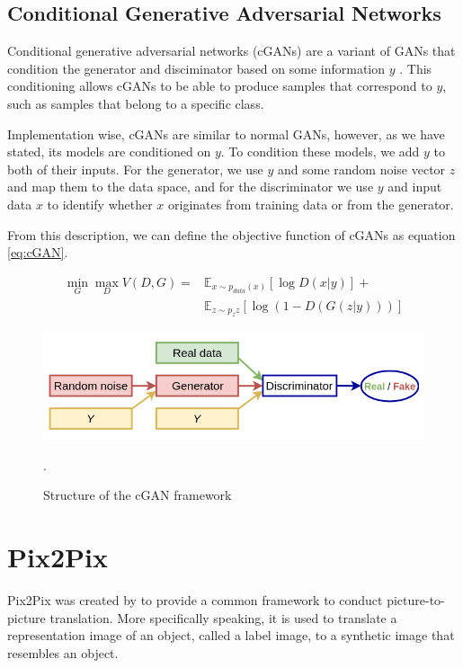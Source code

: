 \documentclass[peerreview]{IEEEtran}
\begin{document}
\subsection{Conditional Generative Adversarial Networks}
Conditional generative adversarial networks (cGANs) are a variant of GANs that condition the generator and disciminator based on some information $y$ \cite{mirza2014conditional}. This conditioning allows cGANs to be able to produce samples that correspond to $y$, such as samples that belong to a specific class.

Implementation wise, cGANs are similar to normal GANs, however, as we have stated, its models are conditioned on $y$. To condition these models, we add $y$ to both of their inputs. For the generator, we use $y$ and some random noise vector $z$ and map them to the data space, and for the discriminator we use $y$ and input data $x$ to identify whether $x$ originates from training data or from the generator. 

From this description, we can define the objective function of cGANs as equation \ref{eq:cGAN}.

\begin{equation}\label{eq:cGAN}
\begin{split}
\min_{G} \max_{D} V(D, G) = & \mathbb{E}_{x \sim p_{data}(x)} \left[ \log{D(x|y)} \right] + \\
&\mathbb{E}_{z\sim p_z{z}}\left[ \log{(1-D(G(z|y)))}\right]
\end{split}
\end{equation}

\begin{figure}[t]
\centering
\includegraphics[width=0.8\columnwidth]{cGAN.png} 
\caption{Structure of the cGAN framework \cite{nayak2019cganimage}}.
\label{fig:cGAN}
\end{figure}

\section{Pix2Pix}
Pix2Pix was created by \cite{isola2017image} to provide a common framework to conduct picture-to-picture translation. More specifically speaking, it is used to translate a representation image of an object, called a label image, to a synthetic image that resembles an object. 
\end{document}
